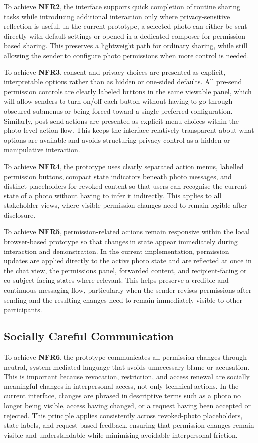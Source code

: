 To achieve \textbf{NFR2}, the interface supports quick completion of routine sharing tasks while introducing additional interaction only where privacy-sensitive reflection is useful. In the current prototype, a selected photo can either be sent directly with default settings or opened in a dedicated composer for permission-based sharing. This preserves a lightweight path for ordinary sharing, while still allowing the sender to configure photo permissions when more control is needed. 

To achieve \textbf{NFR3}, consent and privacy choices are presented as explicit, interpretable options rather than as hidden or one-sided defaults. All pre-send permission controls are clearly labeled buttons in the same viewable panel, which will allow senders to turn on/off each button without having to go through obscured submenus or being forced toward a single preferred configuration. Similarly, post-send actions are presented as explicit menu choices within the photo-level action flow. This keeps the interface relatively transparent about what options are available and avoids structuring privacy control as a hidden or manipulative interaction.

To achieve \textbf{NFR4}, the prototype uses clearly separated action menus, labelled permission buttons, compact state indicators beneath photo messages, and distinct placeholders for revoked content so that users can recognise the current state of a photo without having to infer it indirectly. This applies to all stakeholder views, where visible permission changes need to remain legible after disclosure.

To achieve \textbf{NFR5}, permission-related actions remain responsive within the local browser-based prototype so that changes in state appear immediately during interaction and demonstration. In the current implementation, permission updates are applied directly to the active photo state and are reflected at once in the chat view, the permissions panel, forwarded content, and recipient-facing or co-subject-facing states where relevant. This helps preserve a credible and continuous messaging flow, particularly when the sender revises permissions after sending and the resulting changes need to remain immediately visible to other participants.

\subsection{Socially Careful Communication}
To achieve \textbf{NFR6}, the prototype communicates all permission changes through neutral, system-mediated language that avoids unnecessary blame or accusation. This is important because revocation, restriction, and access renewal are socially meaningful changes in interpersonal access, not only technical actions. In the current interface, changes are phrased in descriptive terms such as a photo no longer being visible, access having changed, or a request having been accepted or rejected. This principle applies consistently across revoked-photo placeholders, state labels, and request-based feedback, ensuring that permission changes remain visible and understandable while minimising avoidable interpersonal friction.

